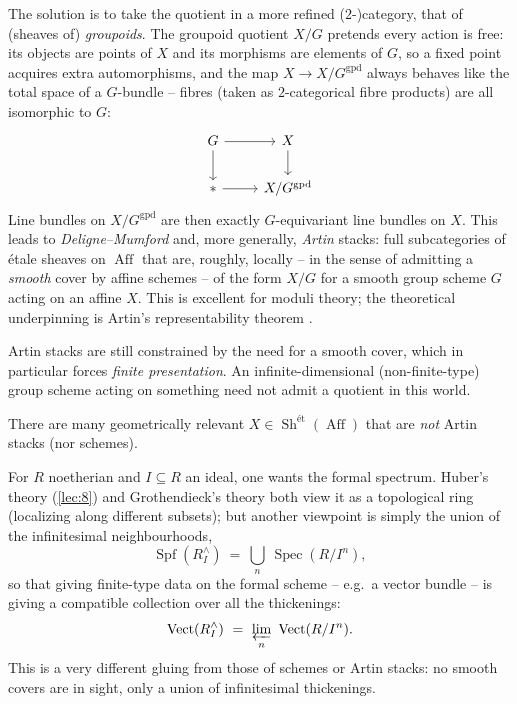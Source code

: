 \begin{remark}
\label{rmk:15:groupoid-quotient}
The solution is to take the quotient in a more refined ($2$-)category, that of
(sheaves of) \emph{groupoids}. The groupoid quotient $X/G$ pretends every action is
free: its objects are points of $X$ and its morphisms are elements of $G$, so a
fixed point acquires extra automorphisms, and the map $X\to X/G^{\mathrm{gpd}}$
always behaves like the total space of a $G$-bundle -- fibres (taken as
$2$-categorical fibre products) are all isomorphic to $G$:
\begin{equation*}
\begin{tikzcd}
G \arrow[r] \arrow[d] & X \arrow[d] \\
\ast \arrow[r] & X/G^{\mathrm{gpd}}
\end{tikzcd}
\end{equation*}
Line bundles on $X/G^{\mathrm{gpd}}$ are then exactly $G$-equivariant line bundles on
$X$. This leads to \emph{Deligne--Mumford} and, more generally, \emph{Artin} stacks:
full subcategories of \'etale sheaves on $\operatorname{Aff}$ that are, roughly,
locally -- in the sense of admitting a \emph{smooth} cover by affine schemes --
of the form $X/G$ for a smooth group scheme $G$ acting on an affine $X$. This is
excellent for moduli theory; the theoretical underpinning is Artin's
representability theorem \cite{Artin_1974}.
\end{remark}

\begin{remark}
\label{rmk:15:smooth-forces-ft}
Artin stacks are still constrained by the need for a smooth cover, which in
particular forces \emph{finite presentation}. An infinite-dimensional (non-finite-type)
group scheme acting on something need not admit a quotient in this world.
\end{remark}

There are many geometrically relevant $X\in \operatorname{Sh}^{\text{\'et}}(\operatorname{Aff})$
that are \emph{not} Artin stacks (nor schemes).

\begin{example}
\label{ex:15:formal-schemes}
For $R$ noetherian and $I\subseteq R$ an ideal, one wants the formal spectrum. Huber's
theory (\cref{lec:8}) and Grothendieck's theory both view it as a topological ring
(localizing along different subsets); but another viewpoint is simply the union of
the infinitesimal neighbourhoods,
\begin{equation}
\label{eq:15:spf}
\operatorname{Spf}(R^{\wedge}_I)\ =\ \bigcup_{n}\ \operatorname{Spec}(R/I^{n}),
\end{equation}
so that giving finite-type data on the formal scheme -- e.g.\ a vector bundle --
is giving a compatible collection over all the thickenings:
\begin{equation}
\label{eq:15:vect-formal}
\operatorname{Vect}(R^{\wedge}_I)\ =\ \varprojlim_{n}\ \operatorname{Vect}(R/I^{n}).
\end{equation}
This is a very different gluing from those of schemes or Artin stacks: no smooth
covers are in sight, only a union of infinitesimal thickenings.
\end{example}

